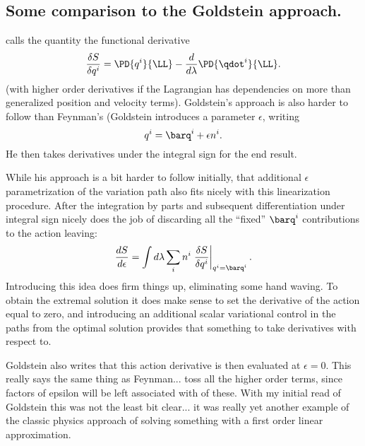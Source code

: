 \subsection{Some comparison to the Goldstein approach.}
%
\citep{goldstein1951cm} calls the quantity  the functional derivative
%
\begin{equation}\label{eqn:eulerLagrange:122}
\frac{\delta S}{\delta q^i} = \PD{q^i}{\LL} -\frac{d}{d\lambda} \PD{\qdot^i}{\LL}.
\end{equation}
%
(with higher order derivatives if the Lagrangian has dependencies on more than generalized position and velocity terms).  Goldstein's
approach is also harder to follow than Feynman's (Goldstein introduces a parameter \(\epsilon\), writing
%
\begin{equation}\label{eqn:euler_lagrange:epsilonvariation}
q^i = \barq^i + \epsilon n^i.
\end{equation}
%
He then takes derivatives under the integral sign for the end result.

While his approach is a bit harder to follow initially, that additional \(\epsilon\) parametrization of the variation path also fits nicely with this
linearization procedure.
After the integration by parts and subsequent differentiation under integral sign nicely does the job of
discarding all the ``fixed'' \(\barq^i\) contributions to the action leaving:
%
\begin{equation}\label{eqn:eulerLagrange:142}
\frac{dS}{d\epsilon} = \int d\lambda \sum_i n^i \left. \frac{\delta S}{\delta q^i} \right\vert_{q^i = \barq^i}.
\end{equation}
%
Introducing this idea does firm things up, eliminating some hand waving.  To obtain the extremal solution it does
make sense to set the derivative of the action equal to zero, and introducing an additional scalar variational control
in the paths from the optimal solution provides that something to take derivatives with respect to.

Goldstein also writes that this action derivative is then evaluated at \(\epsilon = 0\).  This really says the same
thing as Feynman... toss all the higher order terms, since factors of epsilon will be left associated with of these.
With my initial read of Goldstein this was not the least bit clear... it was really yet another example of the classic
physics approach of solving something with a first order linear approximation.
%

